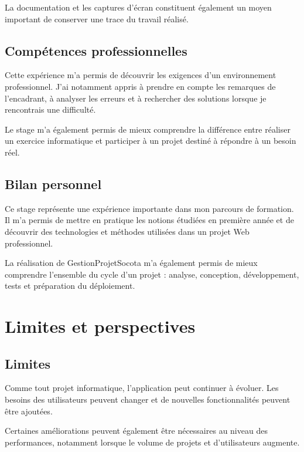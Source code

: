 \documentclass[12pt,a4paper,oneside]{report}
\begin{document}
La documentation et les captures d'écran constituent également un moyen important de conserver une trace du travail réalisé.

\section{Compétences professionnelles}

Cette expérience m'a permis de découvrir les exigences d'un environnement professionnel. J'ai notamment appris à prendre en compte les remarques de l'encadrant, à analyser les erreurs et à rechercher des solutions lorsque je rencontrais une difficulté.

Le stage m'a également permis de mieux comprendre la différence entre réaliser un exercice informatique et participer à un projet destiné à répondre à un besoin réel.

\section{Bilan personnel}

Ce stage représente une expérience importante dans mon parcours de formation. Il m'a permis de mettre en pratique les notions étudiées en première année et de découvrir des technologies et méthodes utilisées dans un projet Web professionnel.

La réalisation de GestionProjetSocota m'a également permis de mieux comprendre l'ensemble du cycle d'un projet : analyse, conception, développement, tests et préparation du déploiement.

\chapter{Limites et perspectives}

\section{Limites}

Comme tout projet informatique, l'application peut continuer à évoluer. Les besoins des utilisateurs peuvent changer et de nouvelles fonctionnalités peuvent être ajoutées.

Certaines améliorations peuvent également être nécessaires au niveau des performances, notamment lorsque le volume de projets et d'utilisateurs augmente.
\end{document}
